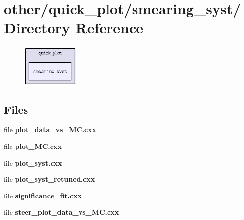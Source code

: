 \section{other/quick\_\-plot/smearing\_\-syst/ Directory Reference}
\label{dir_99a1355693be5f556e5f16efb5e98ae4}


\begin{figure}[H]
\begin{center}
\leavevmode
\includegraphics[width=81pt]{dir_99a1355693be5f556e5f16efb5e98ae4_dep}
\end{center}
\end{figure}
\subsection*{Files}
\begin{CompactItemize}
\item 
file \textbf{plot\_\-data\_\-vs\_\-MC.cxx}
\item 
file \textbf{plot\_\-MC.cxx}
\item 
file \textbf{plot\_\-syst.cxx}
\item 
file \textbf{plot\_\-syst\_\-retuned.cxx}
\item 
file \textbf{significance\_\-fit.cxx}
\item 
file \textbf{steer\_\-plot\_\-data\_\-vs\_\-MC.cxx}
\end{CompactItemize}
